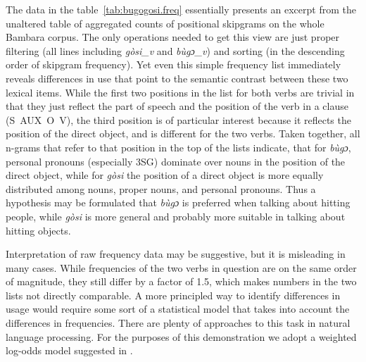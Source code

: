 \documentclass[12pt]{article}
\begin{document}
The data in the table~\ref{tab:bugogosi.freq} essentially presents an
excerpt from the unaltered table of aggregated counts of positional
skipgrams on the whole Bambara corpus. The only operations needed to
get this view are just proper filtering (all lines including
\textit{gòsi\_v} and \textit{bùgɔ\_v}) and sorting (in the descending
order of skipgram frequency). Yet even this simple frequency list
immediately reveals differences in use that point to the semantic
contrast between these two lexical items. While the first two
positions in the list for both verbs are trivial in that they just
reflect the part of speech and the position of the verb in a clause
(\mbox{S AUX O V}), the third position is of particular interest
because it reflects the position of the direct object, and is different
for the two verbs. Taken together, all n-grams that refer to that
position in the top of the lists indicate, that for \textit{bùgɔ},
personal pronouns (especially 3SG) dominate over nouns in the position
of the direct object, while for \textit{gòsi} the position of a direct
object is more equally distributed among nouns, proper nouns, and
personal pronouns. Thus a hypothesis may be formulated that
\textit{bùgɔ} is preferred when talking about hitting people, while
\textit{gòsi} is more general and probably more suitable in talking
about hitting objects.

Interpretation of raw frequency data may be suggestive, but it is
misleading in many cases. While frequencies of the two verbs in
question are on the same order of magnitude, they still differ by a
factor of 1.5, which makes numbers in the two lists not directly
comparable. A more principled way to identify differences in usage
would require some sort of a statistical model that takes into account
the differences in frequencies. There are plenty of approaches to this
task in natural language processing. For the purposes of this
demonstration we adopt a weighted log-odds model suggested in
\textcite{monroe2008}.
\end{document}
